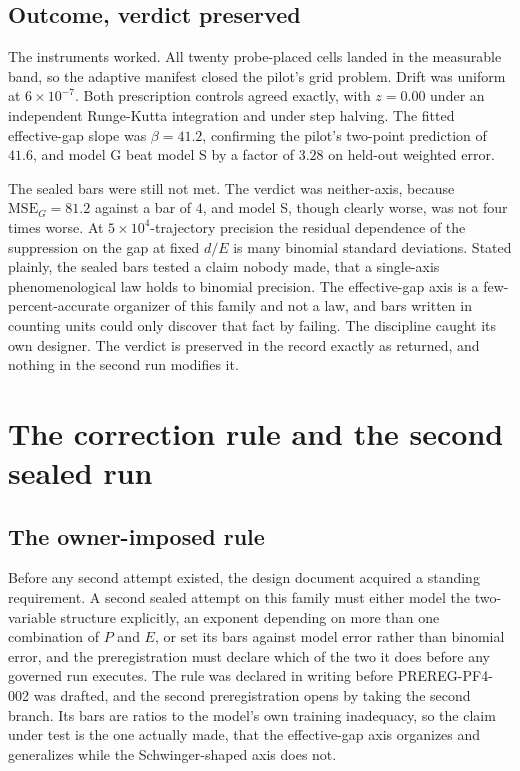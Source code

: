 \documentclass[aps,prd,reprint,nofootinbib,longbibliography]{revtex4-2}
\begin{document}
\subsection{Outcome, verdict preserved}

The instruments worked.  All twenty probe-placed cells landed in the
measurable band, so the adaptive manifest closed the pilot's grid
problem.  Drift was uniform at $6\times10^{-7}$.  Both prescription
controls agreed exactly, with $z = 0.00$ under an independent
Runge-Kutta integration and under step halving.  The fitted
effective-gap slope was $\beta = 41.2$, confirming the pilot's two-point
prediction of $41.6$, and model G beat model S by a factor of $3.28$ on
held-out weighted error.

The sealed bars were still not met.  The verdict was neither-axis,
because $\mathrm{MSE}_{G} = 81.2$ against a bar of $4$, and model S,
though clearly worse, was not four times worse.  At
$5\times10^{4}$-trajectory precision the residual dependence of the
suppression on the gap at fixed $d/E$ is many binomial standard
deviations.  Stated plainly, the sealed bars tested a claim nobody made,
that a single-axis phenomenological law holds to binomial precision.
The effective-gap axis is a few-percent-accurate organizer of this
family and not a law, and bars written in counting units could only
discover that fact by failing.  The discipline caught its own designer.
The verdict is preserved in the record exactly as returned, and nothing
in the second run modifies it.

\section{The correction rule and the second sealed run}
\label{sec:run2}

\subsection{The owner-imposed rule}

Before any second attempt existed, the design document acquired a
standing requirement.  A second sealed attempt on this family must
either model the two-variable structure explicitly, an exponent
depending on more than one combination of $P$ and $E$, or set its bars
against model error rather than binomial error, and the preregistration
must declare which of the two it does before any governed run executes.
The rule was declared in writing before PREREG-PF4-002 was drafted, and
the second preregistration opens by taking the second branch.  Its bars
are ratios to the model's own training inadequacy, so the claim under
test is the one actually made, that the effective-gap axis organizes and
generalizes while the Schwinger-shaped axis does not.
\end{document}
